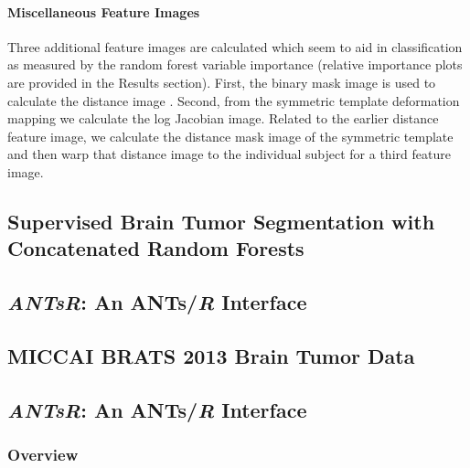 \documentclass[final,5p,times,twocolumn]{elsarticle}
\begin{document}
\paragraph{Miscellaneous Feature Images}
Three additional feature images are calculated which seem to aid in 
classification as measured by the random forest variable importance
(relative importance plots are provided in the Results section).
First, the binary mask image is used to calculate the distance image 
\citep{maurer2003}.  Second, from the symmetric template deformation 
mapping we calculate the log Jacobian image.  Related to the earlier
distance feature image, we calculate the distance mask image of the symmetric
template and then warp that distance image to the individual subject
for a third feature image.








\subsection{Supervised Brain Tumor Segmentation with Concatenated Random Forests}
\subsection{\textit{ANTsR}:  An ANTs/\textit{R} Interface}
\subsection{MICCAI BRATS 2013 Brain Tumor Data}



\clearpage






\subsection{\textit{ANTsR}:  An ANTs/\textit{R} Interface}

\subsubsection{Overview}
\end{document}
